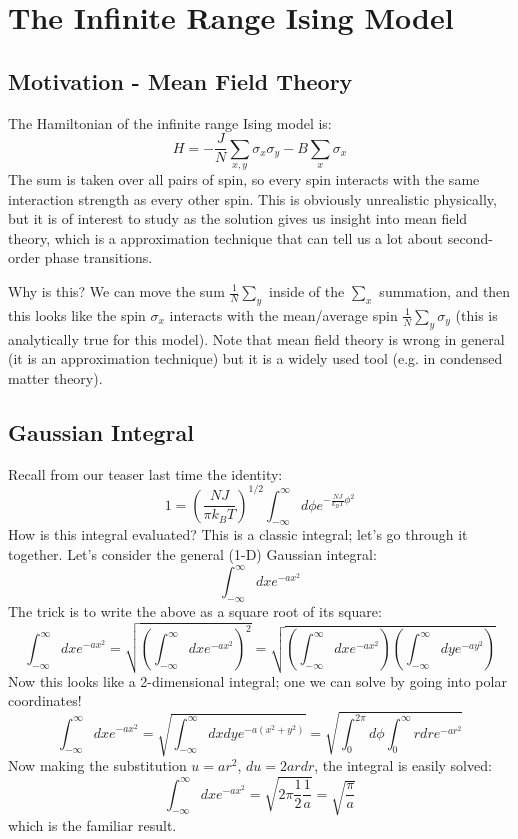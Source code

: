 \section{The Infinite Range Ising Model}
\subsection{Motivation - Mean Field Theory}
The Hamiltonian of the infinite range Ising model is:
\begin{equation}
    H = - \frac{J}{N}\sum_{x, y}\sigma_x \sigma_y - B\sum_x \sigma_x
\end{equation}
The sum is taken over all pairs of spin, so every spin interacts with the same interaction strength as every other spin. This is obviously unrealistic physically, but it is of interest to study as the solution gives us insight into mean field theory, which is a approximation technique that can tell us a lot about second-order phase transitions.

Why is this? We can move the sum $\frac{1}{N}\sum_y$ inside of the $\sum_x$ summation, and then this looks like the spin $\sigma_x$ interacts with the mean/average spin $\frac{1}{N}\sum_y \sigma_y$ (this is analytically true for this model). Note that mean field theory is wrong in general (it is an approximation technique) but it is a widely used tool (e.g. in condensed matter theory).

\subsection{Gaussian Integral}
Recall from our teaser last time the identity:
\begin{equation}
    1 = \left(\frac{NJ}{\pi k_B T}\right)^{1/2}\int_{-\infty}^\infty d\phi e^{-\frac{NJ}{k_B T}\phi^2}
\end{equation}
How is this integral evaluated? This is a classic integral; let's go through it together. Let's consider the general (1-D) Gaussian integral:
\begin{equation}
    \int_{-\infty}^\infty dx e^{-ax^2}
\end{equation}
The trick is to write the above as a square root of its square:
\begin{equation}
    \int_{-\infty}^\infty dx e^{-ax^2} = \sqrt{\left( \int_{-\infty}^\infty dx e^{-ax^2}\right)^2} = \sqrt{\left( \int_{-\infty}^\infty dx e^{-ax^2}\right)\left(\int_{-\infty}^\infty dy e^{-ay^2}\right)}
\end{equation}
Now this looks like a 2-dimensional integral; one we can solve by going into polar coordinates!
\begin{equation}
    \int_{-\infty}^\infty dx e^{-ax^2} = \sqrt{\int_{-\infty}^\infty dxdy e^{-a(x^2 + y^2)}} = \sqrt{\int_{0}^{2\pi}d\phi \int_{0}^\infty rdr e^{-ar^2}}
\end{equation}
Now making the substitution $u = ar^2$, $du = 2ardr$, the integral is easily solved:
\begin{equation}
    \int_{-\infty}^\infty dx e^{-ax^2} = \sqrt{2\pi \frac{1}{2}\frac{1}{a}} = \sqrt{\frac{\pi}{a}}
\end{equation}
which is the familiar result.


